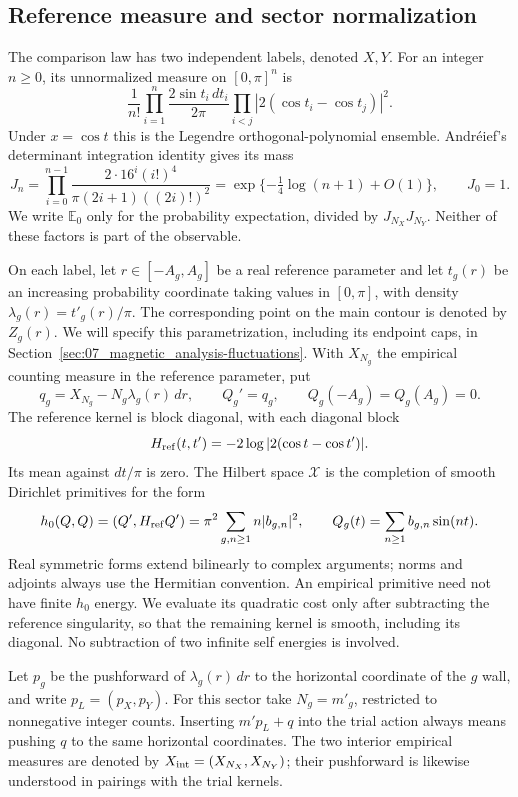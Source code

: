 \subsection{Reference measure and sector normalization}\label{sec:reference-law}

The comparison law has two independent labels, denoted $X,Y$. For an
integer $n\ge0$, its unnormalized measure on $[0,\pi]^n$ is
\[
 \frac1{n!}\prod_{i=1}^n\frac{2\sin t_i\,dt_i}{2\pi}
       \prod_{i<j}|2(\cos t_i-\cos t_j)|^2.
\]
Under $x=\cos t$ this is the Legendre orthogonal-polynomial ensemble.
Andr\'eief's determinant integration identity gives its mass
\cite[equation~(1.3)]{TracyWidom1998}
\begin{equation}\label{eq:reference-normalization}
 J_n=\prod_{i=0}^{n-1}
 \frac{2\cdot16^i(i!)^4}{\pi(2i+1)((2i)!)^2}
 =\exp\{-\tfrac14\log(n+1)+O(1)\},\qquad J_0=1.
\end{equation}
We write $\mathbb E_0$ only for the probability expectation, divided
by $J_{N_X}J_{N_Y}$. Neither of these factors is part of the
observable.

On each label, let $r\in[-A_g,A_g]$ be a real reference parameter
and let $t_g(r)$ be an increasing probability coordinate taking values
in $[0,\pi]$, with density $\lambda_g(r)=t'_g(r)/\pi$.
The corresponding point on the main contour is denoted by $Z_g(r)$.
We will specify this parametrization, including its endpoint caps, in
Section~\ref{sec:07_magnetic_analysis-fluctuations}. With $X_{N_g}$
the empirical counting measure in the reference parameter, put
\[
 q_g=X_{N_g}-N_g\lambda_g(r)\,dr,\qquad Q_g'=q_g,
 \qquad Q_g(-A_g)=Q_g(A_g)=0.
\]
The reference kernel is block diagonal, with each diagonal block
\[
 H_{\rm ref}(t,t')=-2\log|2(\cos t-\cos t')|.
\]
Its mean against $dt/\pi$ is zero. The Hilbert space $\mathcal X$
is the completion of smooth Dirichlet primitives for the form
\[
 h_0(Q,Q)=(Q',H_{\rm ref}Q')
    =\pi^2\sum_{g,n\ge1}n|b_{g,n}|^2,
 \qquad Q_g(t)=\sum_{n\ge1}b_{g,n}\sin(nt).
\]
Real symmetric forms extend bilinearly to complex arguments; norms
and adjoints always use the Hermitian convention. An empirical
primitive need not have finite $h_0$ energy. We evaluate its quadratic
cost only after subtracting the reference singularity, so that the
remaining kernel is smooth, including its diagonal. No subtraction of
two infinite self energies is involved.

Let $p_g$ be the pushforward of $\lambda_g(r)\,dr$ to the horizontal
coordinate of the $g$ wall, and write $p_L=(p_X,p_Y)$. For this
sector take $N_g=m'_g$, restricted to nonnegative integer counts.
Inserting $m'p_L+q$ into the trial action always means pushing $q$
to the same horizontal coordinates. The two interior empirical
measures are denoted by $X_{\rm int}=(X_{N_X},X_{N_Y})$; their
pushforward is likewise understood in pairings with the trial kernels.

